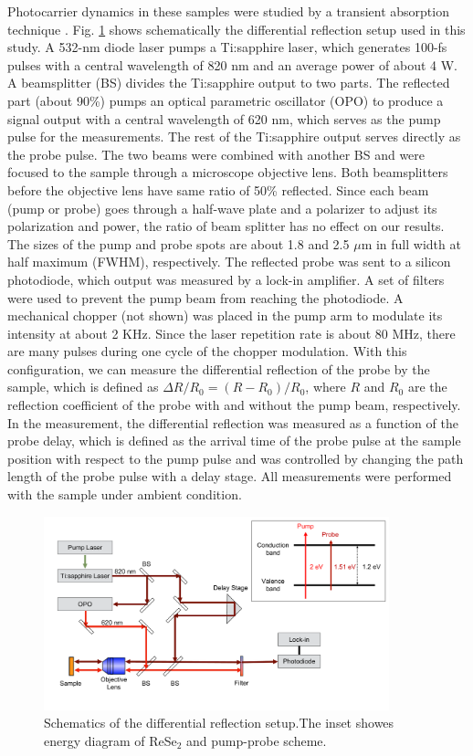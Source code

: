 \documentclass{osa-article}
\begin{document}
Photocarrier dynamics in these samples were studied by a transient absorption technique \cite{b86045406,acsnano82970,afm271604509}. Fig. \ref{fig:setup} shows schematically the differential reflection setup used in this study. A 532-nm diode laser pumps a Ti:sapphire laser, which generates 100-fs pulses with a central wavelength of 820 nm and an average power of about 4 W. A beamsplitter (BS) divides the Ti:sapphire output to two parts. The reflected part (about 90\%) pumps an optical parametric oscillator (OPO) to produce a signal output with a central wavelength of 620 nm, which serves as the pump pulse for the measurements. The rest of the Ti:sapphire output serves directly as the probe pulse.  The two beams were combined with another BS and were focused to the sample through a microscope objective lens. Both beamsplitters before the objective lens have same ratio of 50\% reflected. Since each beam (pump or probe) goes through a half-wave plate and a polarizer to adjust its polarization and power, the ratio of beam splitter has no effect on our results. 
 The sizes of the pump and probe spots are about 1.8 and 2.5 $\mu$m in full width at half maximum (FWHM), respectively. The reflected probe was sent to a silicon photodiode, which output was measured by a lock-in amplifier. A set of filters were used to prevent the pump beam from reaching the photodiode. A mechanical chopper (not shown) was placed in the pump arm to modulate its intensity at about 2 KHz. Since the laser repetition rate is about 80 MHz, there are many pulses during one cycle of the chopper modulation. With this configuration, we can measure the differential reflection of the probe by the sample, which is defined as $\Delta R / R_0 = (R - R_0)/R_0$, where $R$ and $R_0$ are the reflection coefficient of the probe with and without the pump beam, respectively. In the measurement, the differential reflection was measured as a function of the probe delay, which is defined as the arrival time of the probe pulse at the sample position with respect to the pump pulse and was controlled by changing the path length of the probe pulse with a delay stage. All measurements were performed with the sample under ambient condition. 

\begin{figure}
  \centering
  \includegraphics[width=10cm]{setup.pdf}
  \caption{Schematics of the differential reflection setup.The inset showes energy diagram of ReSe$_2$ and pump-probe scheme. }
    \label{fig:setup}
\end{figure}
\end{document}
